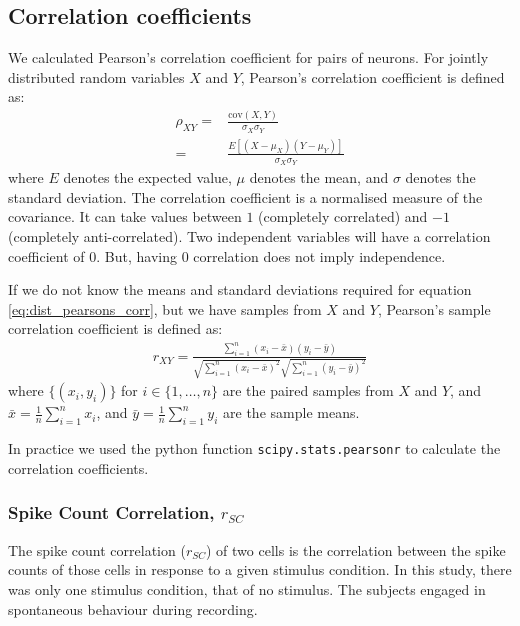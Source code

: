 \documentclass[a4paper,12pt]{article}
\theoremstyle{definition}
\newcommand{\cov}{\text{cov}} %
\begin{document}
    \subsection{Correlation coefficients}
    We calculated Pearson's correlation coefficient for pairs of neurons. For jointly distributed random variables $X$ and $Y$, Pearson's correlation coefficient is defined as:
    \begin{align}\label{eq:dist_pearsons_corr}
        \rho_{XY} =& \frac{\cov(X,Y)}{\sigma_X \sigma_Y} \\
                  =& \frac{E[(X - \mu_X)(Y - \mu_Y)]}{\sigma_X \sigma_Y}
    \end{align}
    where $E$ denotes the expected value, $\mu$ denotes the mean, and $\sigma$ denotes the standard deviation. The correlation coefficient is a normalised measure of the covariance. It can take values between $1$ (completely correlated) and $-1$ (completely anti-correlated). Two independent variables will have a correlation coefficient of $0$. But, having $0$ correlation does not imply independence.

    If we do not know the means and standard deviations required for equation \ref{eq:dist_pearsons_corr}, but we have samples from $X$ and $Y$, Pearson's sample correlation coefficient is defined as:
    \begin{align}
        r_{XY} = \frac{\sum_{i=1}^n (x_i - \bar{x})(y_i - \bar{y})}{\sqrt{\sum_{i=1}^n (x_i - \bar{x})^2}\sqrt{\sum_{i=1}^n (y_i - \bar{y})^2}}
    \end{align}
    where $\lbrace (x_i, y_i) \rbrace$ for $i \in \lbrace 1, \dots, n \rbrace$ are the paired samples from $X$ and $Y$, and $\bar{x} = \frac{1}{n}\sum_{i=1}^n x_i$, and $\bar{y} = \frac{1}{n}\sum_{i=1}^n y_i$ are the sample means.

    In practice we used the python function \texttt{scipy.stats.pearsonr} to calculate the correlation coefficients.

        \subsubsection{Spike Count Correlation, $r_{SC}$}\label{sec:spike_count_correlation}
        The spike count correlation ($r_{SC}$) of two cells is the correlation between the spike counts of those cells in response to a given stimulus condition. In this study, there was only one stimulus condition, that of no stimulus. The subjects engaged in spontaneous behaviour during recording.
\end{document}
